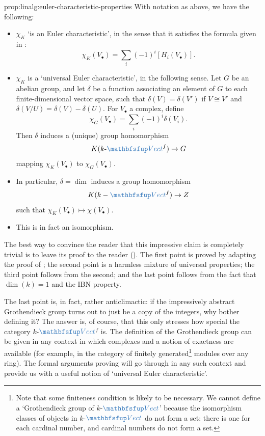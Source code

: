 \begin{prop}{}{prop:linalg:euler-characteristic-properties}
  With notation as above, we have the following:
  \begin{itemize}
  \item $\chi_K$ `is an Euler characteristic', in the sense that it
    satisfies the formula given in :
    \[
      \chi_K(V_\bullet) = \sum_i (-1)^i [H_i(V_\bullet)].
    \]
  \item $\chi_K$ is a `universal Euler characteristic', in the
    following sense. Let $G$ be an abelian group, and let $\delta$ be
    a function associating an element of $G$ to each
    finite-dimensional vector space, such that
    $\delta(V) = \delta(V')$ if $V \cong V'$ and
    $\delta(V/U) = \delta(V) - \delta(U)$. For $V_\bullet$ a complex,
    define
    \[
      \chi_G(V_\bullet) = \sum_i (-1)^i \delta(V_i).
    \]
    Then $\delta$ induces a (unique) group homomorphism
    \[
      K(k\text{-}\categ{Vect}^f) \to G
    \]
    mapping $\chi_K(V_\bullet)$ to $\chi_G(V_\bullet)$.
  \item In particular, $\delta = \dim$ induces a group homomorphism
    \[
      K(k- \categ{Vect}^f) \to \Z
    \]
    such that $\chi_K(V_\bullet) \mapsto \chi(V_\bullet)$.
  \item This is in fact an isomorphism.
  \end{itemize}
\end{prop}
The best way to convince the reader that this impressive claim is
completely trivial is to leave its proof to the reader
(). The first point is proved
by adapting the proof of ; the second point is a
harmless mixture of universal properties; the third point follows from
the second; and the last point follows from the fact that
$\dim(k) = 1$ and the IBN property.

The last point is, in fact, rather anticlimactic: if the impressively
abstract Grothendieck group turns out to just be a copy of the
integers, why bother defining it? The answer is, of course, that this
only stresses how special the category
$k$-$\categ{Vect}$$^f$ is. The definition of the Grothendieck group
can be given in any context in which complexes and a notion of
exactness are available (for example, in the category of finitely
generated\footnote{Note that some finiteness condition is likely to be
  necessary. We cannot define a `Grothendieck group of
  $k$-$\categ{Vect}$' because the isomorphism classes of objects in
  $k$-$\categ{Vect}$ do not form a set: there is one for each cardinal
  number, and cardinal numbers do not form a set.}  modules over any
ring). The formal arguments proving  will go through
in any such context and provide us with a useful notion of `universal
Euler characteristic'.

